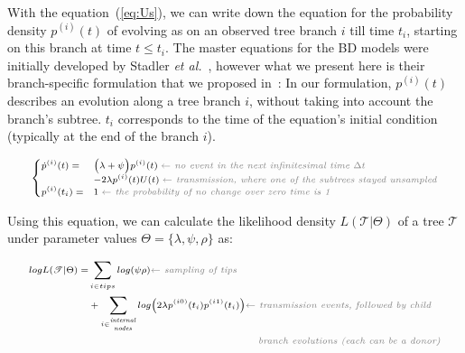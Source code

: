 \documentclass[10pt,letterpaper]{article}
\begin{document}
With the equation~(\ref{eq:Us}), we can write down the equation for the probability density $p^{(i)}(t)$ of evolving as on an observed tree branch $i$ till time $t_i$, starting on this branch at time $t \leq t_i$. The master equations for the BD models were initially developed by Stadler \textit{et al.}~\cite{Stadler2009}, however what we present here is their branch-specific formulation that we proposed in~\cite{zhukovaFastAccurateMaximumLikelihood2022}:
In our formulation, ${p}^{(i)}(t)$ describes an evolution along a tree branch $i$, without taking into account the branch's subtree. $t_i$ corresponds to the time of the equation's initial condition (typically at the end of the branch $i$). %

\begin{equation}
\scriptsize
\begin{cases}
\dot{p}^{(i)}(t) = & \Big(\lambda + \psi\Big) p^{(i)}(t)\; \textit{\color{gray} $\leftarrow$ no event in the next infinitesimal time $\Delta t$ }\\
    & - 2 \lambda p^{(i)}(t)U(t)\;  \textit{\color{gray} $\leftarrow$ transmission, where one of the subtrees stayed unsampled}\\
p^{(i)}(t_i) =  &1\;  \textit{\color{gray} $\leftarrow$ the probability of no change over zero time is 1}
\end{cases}\label{eq:p}
\end{equation}


Using this equation, we can calculate the likelihood density $L(\mathscr{T}|\Theta)$ of a tree $\mathscr{T}$ under parameter values $\Theta = \{\lambda, \psi, \rho\}$ as:

\begin{equation}
\scriptsize
\begin{split}
log L(\mathscr{T}|\Theta) =  &\sum\limits_{i \in tips}  log(\psi \rho)  \textit{\color{gray} $\leftarrow$ sampling of tips} \\
 &+\sum\limits_{i \in \stackanchor{\tiny\textit{internal}}{\tiny\textit{nodes}}} log \big(2 \lambda p^{(i0)}(t_i)p^{(i1)}(t_i)\big)   \textit{\color{gray} $\leftarrow$ transmission events, followed by child }\\
 & ~~~~~~~~~~~~~~~~~~~~~~~~~~~~~~~~~~~~~~~~~~~~~~~~~~\textit{\color{gray} branch evolutions (each can be a donor)}  \label{eq:mtbd_tree_likelihood}
\end{split}
\end{equation}
\end{document}
